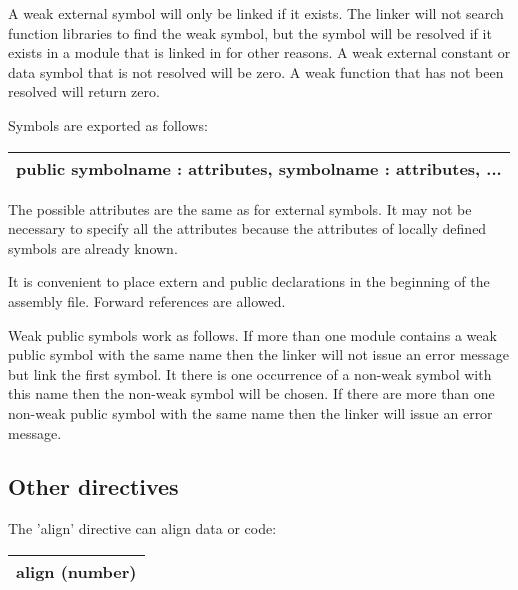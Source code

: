 \documentclass[forwardcom.tex]{subfiles}
\begin{document}
A weak external symbol will only be linked if it exists. The linker will not search function libraries to find the weak symbol, but the symbol will be resolved if it exists in a module that is linked in for other reasons.
A weak external constant or data symbol that is not resolved will be zero. A weak function that has not  been resolved will return zero.
\vspace{2mm}

Symbols are exported as follows:
\vspace{2mm}

\begin{tabular}{|p{150mm}|}
\hline
\hspace{4mm} public symbolname : attributes, symbolname : attributes, ...\\
\hline
\end{tabular}
\vspace{2mm}

The possible attributes are the same as for external symbols. It may not be necessary to specify all the attributes because the attributes of locally defined symbols are already known. 
\vspace{2mm}

It is convenient to place extern and public declarations in the beginning of the assembly file. Forward references are allowed.
\vspace{2mm}

Weak public symbols work as follows. If more than one module contains a weak public symbol with the same name then the linker will not issue an error message but link the first symbol.
It there is one occurrence of a non-weak symbol with this name then the non-weak symbol will be chosen. If there are more than one non-weak public symbol with the same name then the linker will issue an error message.


\subsection{Other directives} \label{assemblyOtherDirectives}

The 'align' directive can align data or code:
\vspace{2mm}

\begin{tabular}{|p{150mm}|}
\hline
\hspace{4mm} align (number)\\
\hline
\end{tabular}
\vspace{2mm}
\end{document}
